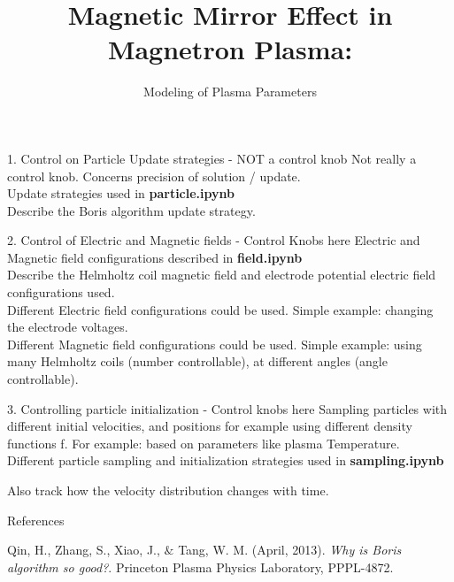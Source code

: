 \documentclass{beamer}
\title[]{Magnetic Mirror Effect in Magnetron Plasma:}
\subtitle{Modeling of Plasma Parameters}
\begin{document}
	
	\begin{frame}
		\titlepage	
	\end{frame}	
	
	\begin{frame}[t]{1. Control on Particle Update strategies - NOT a control knob }
		Not really a control knob. Concerns precision of solution / update. \\
		
		\noindent Update strategies used in \textbf{particle.ipynb}\\
		
		\noindent Describe the Boris algorithm update strategy.
	\end{frame}

	\begin{frame}[t]{2. Control of Electric and Magnetic fields - Control Knobs here}
		Electric and Magnetic field configurations described in \textbf{field.ipynb} \\
		
		\noindent Describe the Helmholtz coil magnetic field and electrode potential electric field configurations used. \\
		
		\noindent
		Different Electric field configurations could be used. Simple example: changing the electrode voltages. \\
		
		\noindent Different Magnetic field configurations could be used. Simple example: using many Helmholtz coils (number controllable), at different angles (angle controllable).
	\end{frame}

	\begin{frame}[t]{3. Controlling particle initialization - Control knobs here}
		Sampling particles with different initial velocities, and positions for example using different density functions f. For example: based on parameters like plasma Temperature. \\
		
		\noindent Different particle sampling and initialization strategies used in \textbf{sampling.ipynb}
		
		Also track how the velocity distribution changes with time.
	\end{frame}

	\begin{frame}[t]{References}
	\begin{thebibliography}{}
		\bibitem{Borisgood}
		Qin, H., Zhang, S., Xiao, J., $\&$ Tang, W. M. (April, 2013). \textit{Why is Boris algorithm so good?}. Princeton Plasma Physics Laboratory, PPPL-4872.
		
	\end{thebibliography}
	\end{frame}
\end{document}
